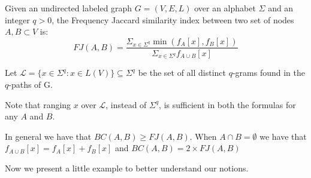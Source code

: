 \begin{definizione}
	Given an undirected labeled graph $G = (V,E,L)$ over an alphabet $\Sigma$ and an integer $q > 0$, the Frequency Jaccard similarity index between two set of nodes $A, B \subset V$ is:
	\begin{equation}\label{jaccard-sub}	
	FJ(A,B) = \frac{ \Sigma_{x \in \Sigma^{q}} \min(f_{A}[x], f_{B}[x]) }{ \Sigma_{x \in \Sigma^{q}} f_{A \cup B}[x] }
	\end{equation}
\end{definizione}

Let $\mathcal{L} = \{ x \in \Sigma^{q} : x \in L(V) \} \subseteq \Sigma^{q}$ be the set of all distinct $q$-grams found in the $q$-paths of G. 

Note that ranging $x$ over $\mathcal{L}$, instead of $\Sigma^{q}$, is sufficient in both the formulas for any $A$ and $B$.\medskip

In general we have that $BC(A,B) \geq FJ(A,B)$. 
When $A \cap B = \emptyset$ we have that $f_{A \cup B}[x] = f_{A}[x] + f_{B}[x]$ and $BC(A,B) = 2 \times FJ(A,B)$\medskip

Now we present a little example to better understand our notions.\medskip

